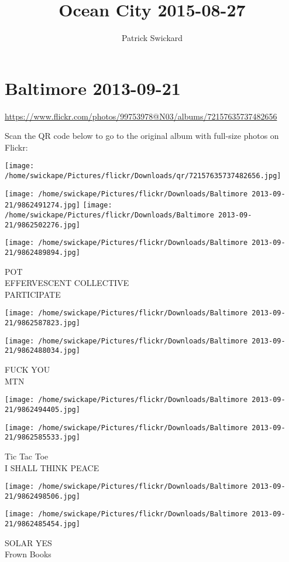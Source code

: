\documentclass[10pt,letterpaper]{article}
\title{Ocean City 2015-08-27}
\author{Patrick Swickard}
\date{}
\begin{document}
\section*{Baltimore 2013-09-21}

\url{https://www.flickr.com/photos/99753978@N03/albums/72157635737482656}

Scan the QR code below to go to the original album with full-size photos on Flickr:

\texttt{[image: /home/swickape/Pictures/flickr/Downloads/qr/72157635737482656.jpg]}
\pagebreak

\texttt{[image: /home/swickape/Pictures/flickr/Downloads/Baltimore 2013-09-21/9862491274.jpg]}
\texttt{[image: /home/swickape/Pictures/flickr/Downloads/Baltimore 2013-09-21/9862502276.jpg]}

\texttt{[image: /home/swickape/Pictures/flickr/Downloads/Baltimore 2013-09-21/9862489894.jpg]}

POT\\
EFFERVESCENT COLLECTIVE\\
PARTICIPATE
\pagebreak

\texttt{[image: /home/swickape/Pictures/flickr/Downloads/Baltimore 2013-09-21/9862587823.jpg]}

\vspace{0.25in}
\texttt{[image: /home/swickape/Pictures/flickr/Downloads/Baltimore 2013-09-21/9862488034.jpg]}

FUCK YOU\\
MTN
\pagebreak

\texttt{[image: /home/swickape/Pictures/flickr/Downloads/Baltimore 2013-09-21/9862494405.jpg]}

\vspace{0.25in}
\texttt{[image: /home/swickape/Pictures/flickr/Downloads/Baltimore 2013-09-21/9862585533.jpg]}

Tic Tac Toe\\
I SHALL THINK PEACE
\pagebreak

\texttt{[image: /home/swickape/Pictures/flickr/Downloads/Baltimore 2013-09-21/9862498506.jpg]}

\vspace{0.25in}
\texttt{[image: /home/swickape/Pictures/flickr/Downloads/Baltimore 2013-09-21/9862485454.jpg]}

SOLAR YES\\
Frown Books
\pagebreak
\end{document}
